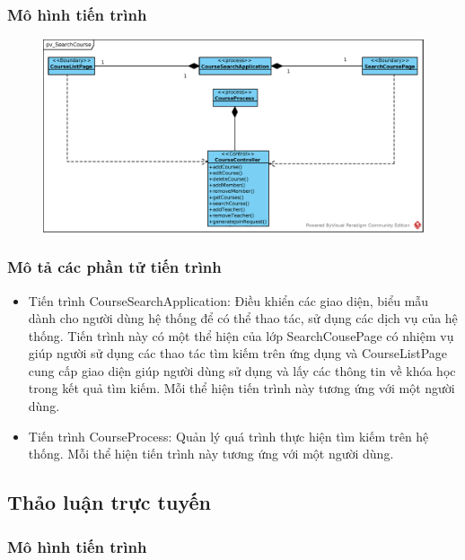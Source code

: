 \documentclass[./../main_file.tex]{subfiles}
\begin{document}
\subsubsection{Mô hình tiến trình}

\begin{figure}[H]
	\centering
	\includegraphics[width=\linewidth]{./images/pv_SearchCourse.eps}
\end{figure}

\subsubsection{Mô tả các phần tử tiến trình}
\begin{itemize}
	\item Tiến trình CourseSearchApplication: Điều khiển các giao diện, biểu mẫu dành cho người dùng hệ thống để có thể thao tác, sử dụng các dịch vụ của hệ thống. Tiến trình này có một thể hiện của lớp SearchCousePage có nhiệm vụ giúp người sử dụng các thao tác tìm kiếm trên ứng dụng và CourseListPage cung cấp giao diện giúp người dùng sử dụng và lấy các thông tin về khóa học trong kết quả tìm kiếm.
	Mỗi thể hiện tiến trình này tương ứng với một người dùng.
	\item Tiến trình CourseProcess: Quản lý quá trình thực hiện tìm kiếm trên hệ thống.
	Mỗi thể hiện tiến trình này tương ứng với một người dùng.
	
\end{itemize}

\subsection{Thảo luận trực tuyến}

\subsubsection{Mô hình tiến trình}
\end{document}
